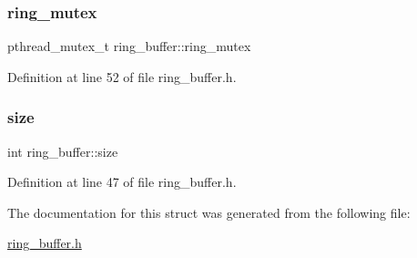 \hypertarget{structring__buffer_a02f5f67c7cfb2d9af345d3b2a4763706}{}\label{structring__buffer_a02f5f67c7cfb2d9af345d3b2a4763706} 
\subsubsection{\texorpdfstring{ring\+\_\+mutex}{ring\_mutex}}
{\footnotesize\ttfamily pthread\+\_\+mutex\+\_\+t ring\+\_\+buffer\+::ring\+\_\+mutex}



Definition at line 52 of file ring\+\_\+buffer.\+h.

\hypertarget{structring__buffer_a0d2f79fe70794fc16c8536b06bff7894}{}\label{structring__buffer_a0d2f79fe70794fc16c8536b06bff7894} 
\subsubsection{\texorpdfstring{size}{size}}
{\footnotesize\ttfamily int ring\+\_\+buffer\+::size}



Definition at line 47 of file ring\+\_\+buffer.\+h.



The documentation for this struct was generated from the following file\+:\begin{DoxyCompactItemize}
\item 
\hyperlink{ring__buffer_8h}{ring\+\_\+buffer.\+h}\end{DoxyCompactItemize}
